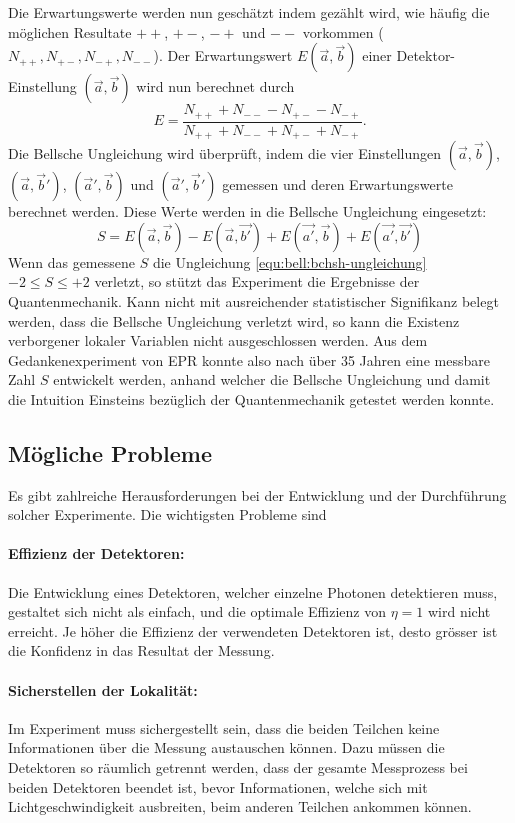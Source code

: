 \begin{refsection}
Die Erwartungswerte werden nun gesch\"atzt indem gez\"ahlt
wird, wie h\"aufig die m\"oglichen Resultate $++$, $+-$, $-+$ und $--$
vorkommen ($N_{++}, N_{+-}, N_{-+}, N_{--}$).
Der Erwartungswert $E(\vec{a},\vec{b})$ einer Detektor-Einstellung 
$(\vec{a},\vec{b})$ wird nun berechnet durch
\begin{equation}
    E = \frac{N_{++} + N_{--} - N_{+-} - N_{-+}}{N_{++} + N_{--} + N_{+-} + N_{-+}}.
\end{equation}
Die Bellsche Ungleichung wird \"uberpr\"uft, indem die vier Einstellungen
$(\vec{a},\vec{b})$, $(\vec{a},\vec{b}')$, $(\vec{a}',\vec{b})$
und $(\vec{a}',\vec{b}')$ gemessen und deren Erwartungswerte berechnet werden. 
Diese Werte werden in die Bellsche Ungleichung eingesetzt:
\begin{equation}
    S = E(\vec{a},\vec{b}) - E(\vec{a},\vec{b'}) + E(\vec{a'},\vec{b}) + E(\vec{a'},\vec{b'})
\end{equation}
Wenn das gemessene $S$ die Ungleichung \eqref{equ:bell:bchsh-ungleichung} 
$-2 \leq S \leq +2$
verletzt, so st\"utzt das Experiment die Ergebnisse der Quantenmechanik.
Kann nicht mit ausreichender statistischer Signifikanz belegt werden, dass
die Bellsche Ungleichung verletzt wird, so kann die Existenz verborgener
lokaler Variablen nicht ausgeschlossen werden.
Aus dem Gedankenexperiment von EPR konnte also nach \"uber 35 Jahren eine
messbare Zahl $S$ entwickelt werden, anhand welcher die Bellsche Ungleichung und
damit die Intuition Einsteins bez\"uglich der Quantenmechanik getestet werden
konnte.

\subsection{M\"ogliche Probleme}
Es gibt zahlreiche Herausforderungen bei der Entwicklung und der Durchf\"uhrung
solcher Experimente.
Die wichtigsten Probleme sind

\paragraph{Effizienz der Detektoren:}
Die Entwicklung eines Detektoren, welcher einzelne Photonen detektieren muss,
gestaltet sich nicht als einfach, und die optimale Effizienz von $\eta = 1$ wird
nicht erreicht.
Je h\"oher die Effizienz der verwendeten Detektoren ist, desto gr\"osser ist die
Konfidenz in das Resultat der Messung. 

\paragraph{Sicherstellen der Lokalit\"at:}
Im Experiment muss sichergestellt sein, dass die beiden Teilchen keine
Informationen \"uber die Messung austauschen k\"onnen.
Dazu m\"ussen die Detektoren so r\"aumlich getrennt werden, dass
der gesamte Messprozess bei beiden Detektoren beendet ist, bevor Informationen,
welche sich mit Lichtgeschwindigkeit ausbreiten, beim anderen Teilchen
ankommen k\"onnen. 


\end{refsection}
